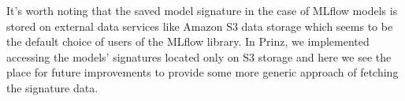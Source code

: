 It’s worth noting that the saved model signature in the case of MLflow models is stored on external data
services like Amazon S3 data storage which seems to be the default choice of users of the MLflow library.
In Prinz, we implemented accessing the models’ signatures located only on S3 storage and here we see
the place for future improvements to provide some more generic approach of fetching the signature data.
